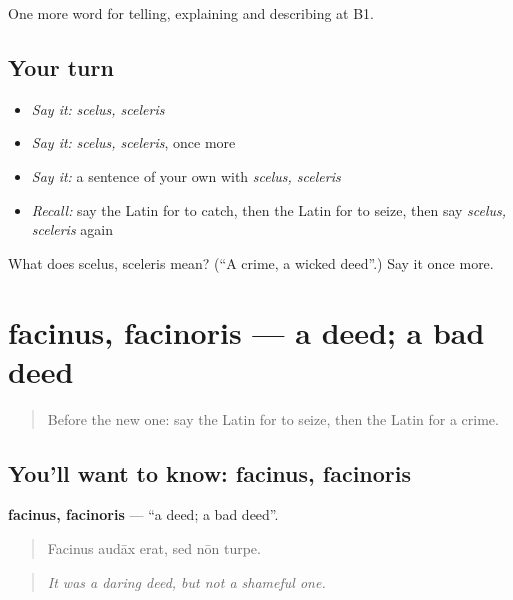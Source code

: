 \begin{grammarlens}[title={What you've built}]
One more word for telling, explaining and describing at B1.
\end{grammarlens}

\subsection*{Your turn}
\begin{itemize}
\raggedright
  \item \emph{Say it:} \emph{scelus, sceleris}
  \item \emph{Say it:} \emph{scelus, sceleris}, once more
  \item \emph{Say it:} a sentence of your own with \emph{scelus, sceleris}
  \item \emph{Recall:} say the Latin for to catch, then the Latin for to seize, then say \emph{scelus, sceleris} again
\end{itemize}

\begin{tcolorbox}[breakable,colback=teal!4,colframe=teal!35!black,title={Before you move on}]
What does scelus, sceleris mean? (\textquotedblleft{}A crime, a wicked deed\textquotedblright{}.) Say it once more.
\end{tcolorbox}
\section[facinus, facinoris]{facinus, facinoris — a deed; a bad deed}

\label{lesson:LA-C305-facinus}



\begin{quote}
Before the new one: say the Latin for to seize, then the Latin for a crime.
\end{quote}

\subsection*{You'll want to know: facinus, facinoris}
\textbf{facinus, facinoris} — \textquotedblleft{}a deed; a bad deed\textquotedblright{}.

\begin{quote}
Facinus audāx erat, sed nōn turpe.
\end{quote}

\begin{quote}
\emph{It was a daring deed, but not a shameful one.}
\end{quote}


